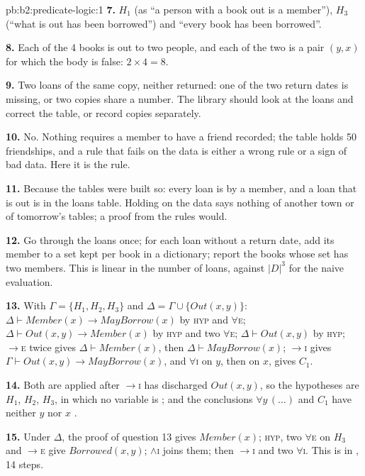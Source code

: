 \begin{solution}{pb:b2:predicate-logic:1}
\textbf{7.} $H_1$ (as ``a person with a book out is a member''), $H_3$ (``what is out has been borrowed'') and ``every book
has been borrowed''.

\textbf{8.} Each of the 4 books is out to two people, and each of the two is a pair $(y, x)$ for which the body is
false: $2 \times 4 = 8$.

\textbf{9.} Two loans of the same copy, neither returned: one of the two return dates is missing, or two copies share a
number. The library should look at the loans and correct the table, or record copies separately.

\textbf{10.} No. Nothing requires a member to have a friend recorded; the table holds 50 friendships, and a rule that
fails on the data is either a wrong rule or a sign of bad data. Here it is the rule.

\textbf{11.} Because the tables were built so: every loan is by a member, and a loan that is out is in the loans table.
Holding on the data says nothing of another town or of tomorrow's tables; a proof from the rules would.

\textbf{12.} Go through the loans once; for each loan without a return date, add its member to a set kept per book in
a dictionary; report the books whose set has two members. This is linear in the number of loans, against $|D|^3$ for
the naive evaluation.

\textbf{13.} With $\Gamma = \{H_1, H_2, H_3\}$ and $\Delta = \Gamma \cup \{\mathit{Out}(x, y)\}$: $\Delta \vdash
\mathit{Member}(x) \to \mathit{MayBorrow}(x)$ by \textsc{hyp} and $\forall$\textsc{e}; $\Delta \vdash \mathit{Out}(x, y)
\to \mathit{Member}(x)$ by \textsc{hyp} and two $\forall$\textsc{e}; $\Delta \vdash \mathit{Out}(x, y)$ by \textsc{hyp};
$\to$\textsc{e} twice gives $\Delta \vdash \mathit{Member}(x)$, then $\Delta \vdash \mathit{MayBorrow}(x)$;
$\to$\textsc{i} gives $\Gamma \vdash \mathit{Out}(x, y) \to \mathit{MayBorrow}(x)$, and $\forall$\textsc{i} on $y$, then
on $x$, gives $C_1$.

\textbf{14.} Both are applied after $\to$\textsc{i} has discharged $\mathit{Out}(x, y)$, so the hypotheses are $H_1$,
$H_2$, $H_3$,  in which no variable is ; and the conclusions $\forall y\, (\dots)$ and $C_1$ have neither
$y$ nor $x$ .

\textbf{15.} Under $\Delta$, the proof of question 13 gives $\mathit{Member}(x)$; \textsc{hyp}, two $\forall$\textsc{e}
on $H_3$ and $\to$\textsc{e} give $\mathit{Borrowed}(x, y)$; $\wedge$\textsc{i} joins them; then $\to$\textsc{i} and two
$\forall$\textsc{i}. This is  in , 14 steps.


\end{solution}
